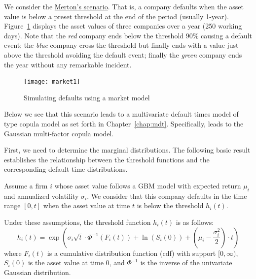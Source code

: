 \documentclass[11pt,fleqn]{book} %
\begin{document}
We consider the \ul{Merton's scenario}. That is, a company defaults when the 
asset value is below a preset threshold at the end of the period (usually 1-year). 
Figure~\ref{fig:market1} displays the asset values of three companies over a 
year (250 working days). 
Note that the \emph{red} company ends below the threshold $90\%$ causing a 
default event; the \emph{blue} company cross the threshold but finally ends 
with a value just above the threshold avoiding the default event; finally the 
\emph{green} company ends the year without any remarkable incident.

\begin{figure}[!ht]
	\centering
	\texttt{[image: market1]}
	\caption{Simulating defaults using a market model}
	\label{fig:market1}
\end{figure}

Below we see that this scenario leads to a multivariate default times model of 
type copula model as set forth in Chapter~\ref{chap:mdt}. Specifically, leads 
to the Gaussian multi-factor copula model.

First, we need to determine the marginal distributions. The following basic result 
establishes the relationship between the threshold functions and the corresponding 
default time distributions. 

\begin{proposition}
	\label{prop:mmdtf}
	Assume a firm $i$ whose asset value follows a GBM model with expected return 
	$\mu_i$ and annualized volatility $\sigma_i$. We consider that this company 
	defaults in the time range $[0,t]$ when the asset value at time $t$ is below 
	the threshold $h_i(t)$.
	
	Under these assumptions, the threshold function $h_i(t)$ is as follows:
	\begin{displaymath}
		h_i(t) = \exp\left(\sigma_i\sqrt{t}\cdot\Phi^{-1}(F_i(t)) + 
		\ln(S_i(0)) + \left(\mu_i-\frac{\sigma_i^2}{2}\right)\cdot t\right)
	\end{displaymath}
	where $F_i(t)$ is a cumulative distribution function (cdf) with support 
	$[0,\infty)$, $S_i(0)$ is the asset value at time $0$, and $\Phi^{-1}$ is 
	the inverse of the univariate Gaussian distribution.
\end{proposition}
\end{document}
